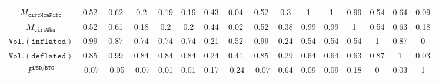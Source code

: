 \begin{tabular}{cccccccccccccccc}
  $M_{\mathtt{circMcaFifo}}$ & 0.52 & 0.62 & 0.2 & 0.19 & 0.19 & 0.43 & 0.04 & 0.52 & 0.3 & 1 & 1 & 0.99 & 0.54 & 0.64 & 0.09 \\ 
  $M_{\mathtt{circWba}}$ & 0.52 & 0.61 & 0.18 & 0.2 & 0.2 & 0.44 & 0.02 & 0.52 & 0.38 & 0.99 & 0.99 & 1 & 0.54 & 0.63 & 0.18 \\ 
  $\mathtt{Vol.(inflated)}$ & 0.99 & 0.87 & 0.74 & 0.74 & 0.74 & 0.21 & 0.52 & 0.99 & 0.24 & 0.54 & 0.54 & 0.54 & 1 & 0.87 & 0 \\ 
  $\mathtt{Vol.(deflated)}$ & 0.85 & 0.99 & 0.84 & 0.84 & 0.84 & 0.24 & 0.41 & 0.85 & 0.29 & 0.64 & 0.64 & 0.63 & 0.87 & 1 & 0.03 \\ 
  $P^{\mathtt{USD}/\mathtt{BTC}}$ & -0.07 & -0.05 & -0.07 & 0.01 & 0.01 & 0.17 & -0.24 & -0.07 & 0.64 & 0.09 & 0.09 & 0.18 & 0 & 0.03 & 1 \\ 
  \end{tabular}
